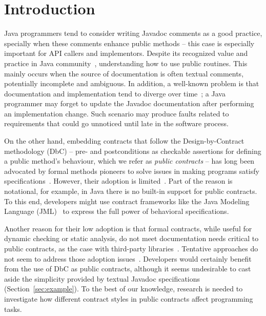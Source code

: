 \section{Introduction}
\label{sec:introduction}

Java programmers tend to consider writing Javadoc comments as a good practice,
specially when these comments enhance public methods -- this case is especially important for API callers and implementors.
Despite its recognized value and practice in Java community~\cite{liveAPI},
understanding how to use public routines.
This mainly occurs when the source of documentation is often textual comments, potentially incomplete and ambiguous. In addition, a well-known problem is that documentation and implementation tend to diverge over time~\cite{Estler-etal14}; 
a Java programmer may forget to update the Javadoc documentation after performing an implementation change. Such scenario may produce faults related to requirements that could go unnoticed until late in the software process.

On the other hand, embedding contracts that follow the Design-by-Contract methodology (DbC) -- pre- and postconditions as checkable assertions for defining a public method's behaviour, which we refer as \emph{public contracts} -- has
long been advocated by formal methods pioneers to solve issues in making programs satisfy specifications~\cite{Hoare1969,Parnas2011}. 
However, their adoption is limited~\cite{Polikarpova-etal09}. 
Part of the reason is notational, for example, in Java there is no built-in support for public contracts.
To this end, developers might use contract frameworks like the Java Modeling Language (JML)~\cite{jml} to express the full power of behavioral specifications.
%
%

Another reason for their low adoption is that formal contracts, while useful for dynamic checking or static analysis, do not meet documentation needs critical to public contracts, as the case with third-party libraries~\cite{Leavens10,Parnas2011}. 
Tentative approaches do not seem to address those adoption issues~\cite{docAnalysis}.
Developers would certainly benefit from the use of DbC as public contracts, although it seems undesirable to cast aside the simplicity provided by textual Javadoc specifications (Section~\ref{sec:example}).
To the best of our knowledge, research is needed to investigate how different contract styles in public contracts affect programming tasks.

